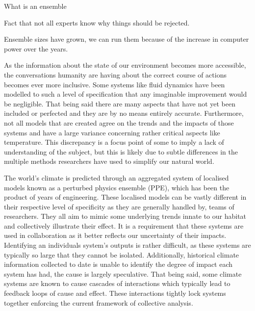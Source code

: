 \documentclass{ecmm427_assignment}
\begin{document}
What is an ensemble

Fact that not all experts know why things should be rejected.

Ensemble sizes have grown, we can run them because of the increase in computer power over the years.



 As the information about the state of our environment becomes more accessible, the conversations humanity are having about the correct course of actions becomes ever more inclusive. Some systems like fluid dynamics have been modelled to such a level of specification that any imaginable improvement would be negligible. That being said there are many aspects that have not yet been included or perfected and they are by no means entirely accurate. Furthermore, not all models that are created agree on the trends and the impacts of those systems and have a large variance concerning rather critical aspects like temperature. This discrepancy is a focus point of some to imply a lack of understanding of the subject, but this is likely due to subtle differences in the multiple methods researchers have used to simplify our natural world. 

 The world's climate is predicted through an aggregated system of localised models known as a perturbed physics ensemble (PPE), which has been the product of years of engineering. These localised models can be vastly different in their respective level of specificity as they are generally handled by,  teams of researchers. They all aim to mimic some underlying trends innate to our habitat and collectively illustrate their effect. It is a requirement that these systems are used in collaboration as it better reflects our uncertainty of their impacts. Identifying an individuals system's outputs is rather difficult, as these systems are typically so large that they cannot be isolated. Additionally, historical climate information collected to date is unable to identify the degree of impact each system has had, the cause is largely speculative. That being said, some climate systems are known to cause cascades of interactions which typically lead to feedback loops of cause and effect. These interactions tightly lock systems together enforcing the current framework of collective analysis.
\end{document}

